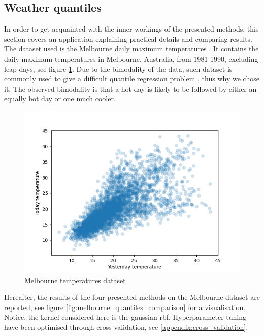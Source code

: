 \subsection{Weather quantiles}
In order to get acquainted with the inner workings of the presented methods, this section covers an application explaining practical details and comparing results.
\\
The dataset used is the Melbourne daily maximum temperatures \cite{hdrcde}. It contains the daily maximum temperatures in Melbourne, Australia, from 1981-1990, excluding leap days, see figure \ref{fig:melbourne_temperature_data}.
Due to the bimodality of the data, such dataset is commonly used to give a difficult quantile regression problem \cite{hyndman1996estimating}, thus why we chose it. The observed bimodality is that a hot day is likely to be followed by either an equally hot day or one much cooler.
\begin{figure}[!h]
    \includegraphics[width=\textwidth]{images/melbourne_temperature.png}
    \caption{Melbourne temperatures dataset}
    \label{fig:melbourne_temperature_data}
\end{figure}
Hereafter, the results of the four presented methods on the Melbourne dataset are reported, see figure \ref{fig:melbourne_quantiles_comparison} for a visualisation. Notice, the kernel considered here is the gaussian rbf. Hyperparameter tuning have been optimised through cross validation, see \ref{appendix:cross_validation}.

